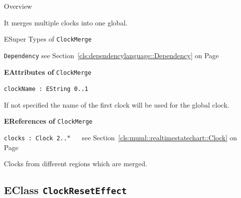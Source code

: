 	\begin{longdescription}
		\item[Overview] 		
				

	

		It merges multiple clocks into one global.		
		\item[ESuper Types of \texttt{ClockMerge}] ~
			\begin{longdescription}
				\item[\texttt{Dependency}] see Section~\ref{cls:dependencylanguage::Dependency} on Page~\pageref{cls:dependencylanguage::Dependency}						\end{longdescription}
		
	
			\item[\textbf{EAttributes of} \texttt{ClockMerge}] ~
			\begin{longdescription}
	\item[\texttt{clockName : EString \symbol{"5B}0..1\symbol{"5D}
}] ~
	
	
	\nopagebreak
		
				

	

		If not specified the name of the first clock will be used for the global clock.		
			\end{longdescription}
			\item[\textbf{EReferences of} \texttt{ClockMerge}] ~
			\begin{longdescription}
	\item[\texttt{clocks : Clock \symbol{"5B}2..$*$\symbol{"5D}
}] ~
	see Section~\ref{cls:muml::realtimestatechart::Clock} on Page~\pageref{cls:muml::realtimestatechart::Clock}
	
	\nopagebreak
		
				

	

		Clocks from different regions which are merged.		
			\end{longdescription}
	
	\end{longdescription}
	

\subsection{EClass \bfseries \texttt{ClockResetEffect}\normalfont}
\label{cls:dependencylanguage::ClockResetEffect} 
	
